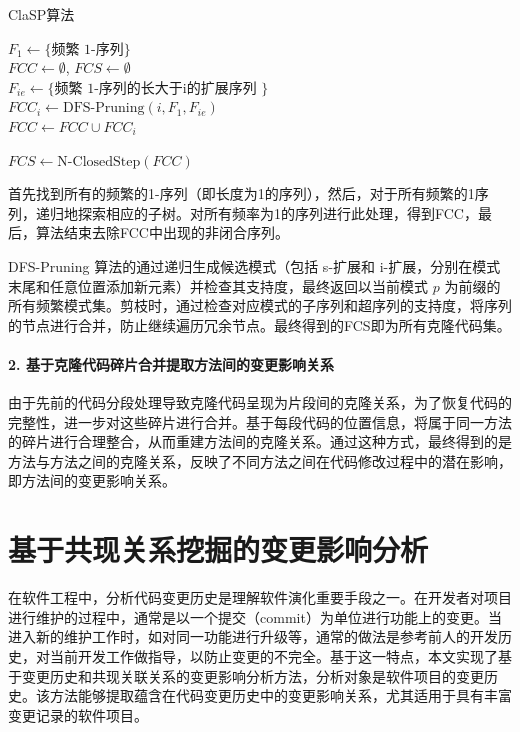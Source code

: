 \begin{algorithm}
\caption{ClaSP算法}
\label{1_ClaSP算法}
 $F_1 \gets \{\text{频繁 1-序列}\}$ \\
 $FCC \gets \emptyset$, $FCS \gets \emptyset$  \\
{
    $F_{ie} \gets \{\text{频繁 1-序列的长大于i的扩展序列 } \}$ \\
    $FCC_i \gets \text{DFS-Pruning}(i, F_1, F_{ie})$ \\
    $FCC \gets FCC \cup FCC_i$
}

 $FCS \gets \text{N-ClosedStep}(FCC)$
\end{algorithm}


首先找到所有的频繁的1-序列（即长度为1的序列），然后，对于所有频繁的1序列，递归地探索相应的子树。对所有频率为1的序列进行此处理，得到FCC，最后，算法结束去除FCC中出现的非闭合序列。
    

DFS-Pruning 算法的通过递归生成候选模式（包括 s-扩展和 i-扩展，分别在模式末尾和任意位置添加新元素）并检查其支持度，最终返回以当前模式 $p$ 为前缀的所有频繁模式集。剪枝时，通过检查对应模式的子序列和超序列的支持度，将序列的节点进行合并，防止继续遍历冗余节点。最终得到的FCS即为所有克隆代码集。

\paragraph{2. 基于克隆代码碎片合并提取方法间的变更影响关系}

由于先前的代码分段处理导致克隆代码呈现为片段间的克隆关系，为了恢复代码的完整性，进一步对这些碎片进行合并。基于每段代码的位置信息，将属于同一方法的碎片进行合理整合，从而重建方法间的克隆关系。通过这种方式，最终得到的是方法与方法之间的克隆关系，反映了不同方法之间在代码修改过程中的潜在影响，即方法间的变更影响关系。

\section{基于共现关系挖掘的变更影响分析}

在软件工程中，分析代码变更历史是理解软件演化重要手段之一。在开发者对项目进行维护的过程中，通常是以一个提交（commit）为单位进行功能上的变更。当进入新的维护工作时，如对同一功能进行升级等，通常的做法是参考前人的开发历史，对当前开发工作做指导，以防止变更的不完全。基于这一特点，本文实现了基于变更历史和共现关联关系的变更影响分析方法，分析对象是软件项目的变更历史。该方法能够提取蕴含在代码变更历史中的变更影响关系，尤其适用于具有丰富变更记录的软件项目。

